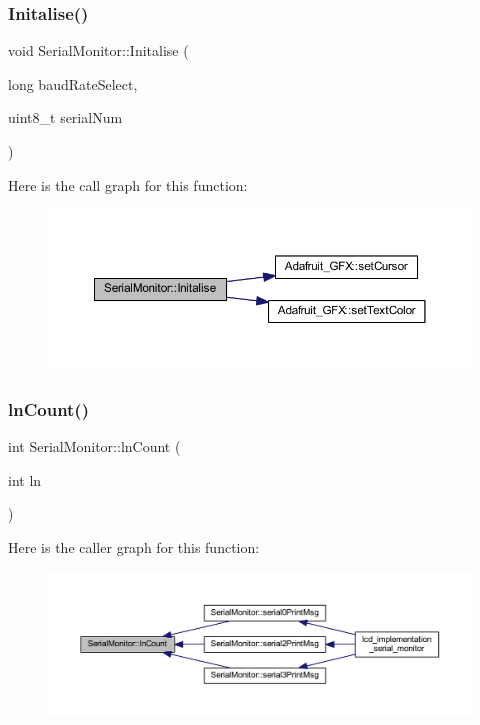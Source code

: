 \subsubsection{\texorpdfstring{Initalise()}{Initalise()}}
{\footnotesize\ttfamily void Serial\+Monitor\+::\+Initalise (\begin{DoxyParamCaption}\item[{long}]{baud\+Rate\+Select,  }\item[{uint8\+\_\+t}]{serial\+Num }\end{DoxyParamCaption})}

Here is the call graph for this function\+:
\nopagebreak
\begin{figure}[H]
\begin{center}
\leavevmode
\includegraphics[width=350pt]{d3/dd4/class_serial_monitor_a2747038f640e76c7b822d3c1ce8a8798_cgraph}
\end{center}
\end{figure}
\mbox{\label{class_serial_monitor_a22fad68f5119182034172883c2d6b49b}} 
\subsubsection{\texorpdfstring{ln\+Count()}{lnCount()}}
{\footnotesize\ttfamily int Serial\+Monitor\+::ln\+Count (\begin{DoxyParamCaption}\item[{int}]{ln }\end{DoxyParamCaption})}

Here is the caller graph for this function\+:
\nopagebreak
\begin{figure}[H]
\begin{center}
\leavevmode
\includegraphics[width=350pt]{d3/dd4/class_serial_monitor_a22fad68f5119182034172883c2d6b49b_icgraph}
\end{center}
\end{figure}
\mbox{\label{class_serial_monitor_a2d27ad4a626b5856b5bfa2ea833ce4b6}} 
